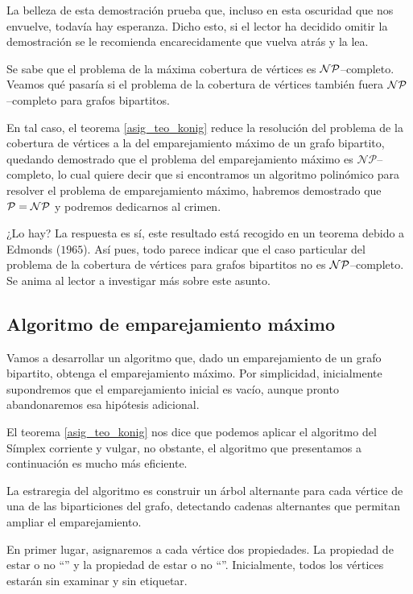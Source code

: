 La belleza de esta demostración prueba que, incluso en esta oscuridad que nos envuelve, todavía hay esperanza. Dicho esto, si el lector ha decidido omitir la demostración se le recomienda encarecidamente que vuelva atrás y la lea.
\begin{obs}[$\mc{NP}$--completitud]
	Se sabe que el problema de la máxima cobertura de vértices es $\mc{NP}$--completo. Veamos qué pasaría si el problema de la cobertura de vértices también fuera $\mc{NP}$--completo para grafos bipartitos.
	
	En tal caso, el teorema \ref{asig_teo_konig} reduce la resolución del problema de la cobertura de vértices a la del emparejamiento máximo de un grafo bipartito, quedando demostrado que el problema del emparejamiento máximo es $\mathcal{NP}$--completo, lo cual quiere decir que si encontramos un algoritmo polinómico para resolver el problema de emparejamiento máximo, habremos demostrado que $\mathcal{P}=\mathcal{NP}$ y podremos dedicarnos al crimen.
	
	¿Lo hay? La respuesta es sí, este resultado está recogido en un teorema debido a Edmonds ($1965$). Así pues, todo parece indicar que el caso particular del problema de la cobertura de vértices para grafos bipartitos no es $\mc{NP}$--completo. Se anima al lector a investigar más sobre este asunto.
\end{obs}
\subsection{Algoritmo de emparejamiento máximo}
Vamos a desarrollar un algoritmo que, dado un emparejamiento de un grafo bipartito, obtenga el emparejamiento máximo. Por simplicidad, inicialmente supondremos que el emparejamiento inicial es vacío, aunque pronto abandonaremos esa hipótesis adicional.

\begin{obs}
	El teorema \ref{asig_teo_konig} nos dice que podemos aplicar el algoritmo del Símplex corriente y vulgar, no obstante, el algoritmo que presentamos a continuación es mucho más eficiente.
\end{obs}

La estraregia del algoritmo es construir un árbol alternante para cada vértice de una de las biparticiones del grafo, detectando cadenas alternantes que permitan ampliar el emparejamiento.

En primer lugar, asignaremos a cada vértice dos propiedades. La propiedad de estar o no ``'' y la propiedad de estar o no ``''. Inicialmente, todos los vértices estarán sin examinar y sin etiquetar.

